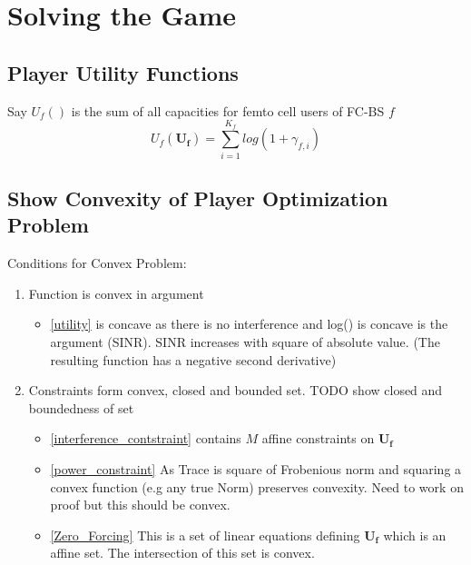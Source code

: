 \documentclass[12pt]{article}
\begin{document}
\section{Solving the Game}
\subsection{Player Utility Functions}

Say $U_f() $ is the sum of all capacities for femto cell users of FC-BS $f$ 
\begin{displaymath}
U_f(\mathbf{U_f}) = \sum^{K_f}_{i=1} log(1+\gamma_{f,i})
\end{displaymath}

\subsection{Show Convexity of Player Optimization Problem}

Conditions for Convex Problem:

\begin{enumerate}
\item Function is convex in argument 
\begin{itemize}
\item\eqref{utility} is concave as there is no interference and log() is concave is the argument (SINR). SINR increases with square of absolute value. (The resulting function has a negative second derivative)

\end{itemize}

\item Constraints  form convex, closed and bounded set. TODO show closed and boundedness of set

\begin{itemize}

\item\eqref{interference_contstraint} contains $M$ affine constraints on $\mathbf{U_f}$

\item\eqref{power_constraint} As Trace is square of Frobenious norm and squaring a convex function (e.g any true Norm) preserves convexity.
Need to work on proof but this should be convex.

\item\eqref{Zero_Forcing} This is a set of linear equations defining $\mathbf{U_f}$ which is an affine set. The intersection of this set is convex.

\end{itemize}
\end{enumerate}
\end{document}

